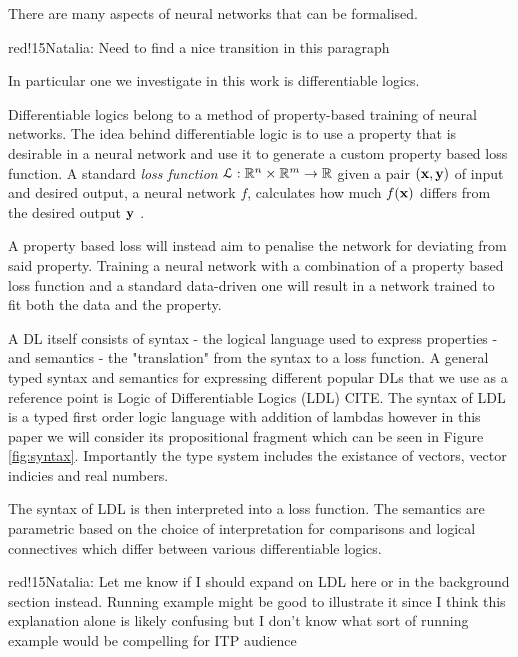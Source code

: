 \documentclass[a4paper,UKenglish,cleveref, autoref, thm-restate]{lipics-v2021}
\newcommand{\natalia}[1]{\begin{authorComment}{red!15}Natalia: #1\end{authorComment}}
\begin{document}
There are many aspects of neural networks that can be formalised. \natalia{Need to find a nice transition in this paragraph}In particular one we investigate in this work is differentiable logics.

Differentiable logics belong to a method of property-based training of neural networks. The idea behind differentiable logic is to use a property that is desirable in a neural network and use it to generate a custom property based loss function. A standard \emph{loss function} $\mathcal{L}: {\mathbb R}^n \times {\mathbb R}^m \rightarrow {\mathbb R}$ given a pair $(\mathbf{x}, \mathbf{y})$ of input and desired output, a neural network $f$, calculates how much $f(\mathbf{x})$ differs from the desired output $\mathbf{y}$ \cite{wang2020comprehensive}.

A property based loss will instead aim to penalise the network for deviating from said property. Training a neural network with a combination of a property based loss function and a standard data-driven one will result in a network trained to fit both the data and the property. 

A DL itself consists of syntax - the logical language used to express properties - and semantics - the "translation" from the syntax to a loss function. A general typed syntax and semantics for expressing different popular DLs that we use as a reference point is Logic of Differentiable Logics (LDL) CITE. The syntax of LDL is a typed first order logic language with addition of lambdas however in this paper we will consider its propositional fragment which can be seen in Figure \ref{fig:syntax}. Importantly the type system includes the existance of vectors, vector indicies and real numbers.

The syntax of LDL is then interpreted into a loss function. The semantics are parametric based on the choice of interpretation for comparisons and logical connectives which differ between various differentiable logics.

\natalia{Let me know if I should expand on LDL here or in the background section instead. Running example might be good to illustrate it since I think this explanation alone is likely confusing but I don't know what sort of running example would be compelling for ITP audience}
\end{document}
